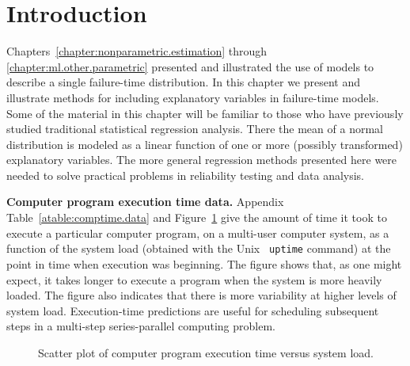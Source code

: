 \section{Introduction}
Chapters~\ref{chapter:nonparametric.estimation} through
\ref{chapter:ml.other.parametric} presented and illustrated the
use of models to describe a single failure-time distribution. In
this chapter we present and illustrate methods for including
explanatory variables in failure-time models.  Some of the material
in this chapter will be familiar to those who have previously
studied traditional statistical regression analysis. There the mean
of a normal distribution is modeled as a linear function of one or
more (possibly transformed) explanatory variables. The more general
regression methods presented here were needed to solve practical
problems in reliability testing and data analysis.
\begin{example}
\label{example:comptime.data}
{\bf Computer program execution time data.} Appendix
Table~\ref{atable:comptime.data} and
Figure~\ref{figure:comptime.data.ps} give the amount of time it took
to execute a particular computer program, on a multi-user computer
system, as a function of the system load (obtained with the Unix {\tt
uptime} command) at the point in time when execution was beginning.
The figure shows that, as one might expect, it takes longer to execute
a program when the system is more heavily loaded. The figure also
indicates that there is more variability at higher levels of system
load.  Execution-time predictions are useful for scheduling subsequent
steps in a multi-step series-parallel computing problem.
\end{example}

\begin{figure}
\caption{Scatter plot of computer program execution time versus
system load.}
\label{figure:comptime.data.ps}
\end{figure}

